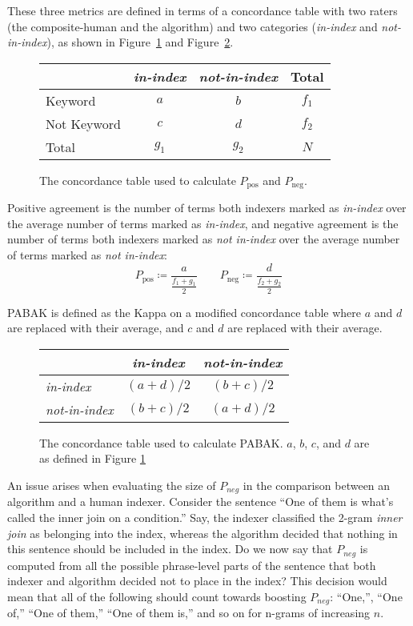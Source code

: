 These three metrics are defined in terms of a concordance table with
two raters (the composite-human and the algorithm) and two
categories ({\em in-index} and {\em not-in-index}), as shown in
Figure~\ref{fig:concordance_1} and Figure~\ref{fig:pabak}.

\begin{figure}[h]
\caption{The concordance table used to calculate $P_{\text{pos}}$ and $P_{\text{neg}}$. }
\label{fig:concordance_1}
\begin{tabular}{l || c c c}
& {\em in-index} & {\em not-in-index} & Total \\
\hline \hline
Keyword & $a$ & $b$ & $f_1$ \\
Not Keyword & $c$ & $d$ & $f_2$ \\
Total & $g_1$ & $g_2$ & $N$ \\
\end{tabular}
\end{figure}

Positive agreement is the number of terms both indexers marked as {\em
  in-index} over the average number of terms marked as {\em in-index}, and
negative agreement is the number of terms both indexers marked as {\em not
  in-index} over the average number of terms marked as {\em not
  in-index}:
\begin{equation*}
P_{\text{pos}} \coloneqq \frac{a}{\frac{f_1 + g_1}{2}}
 \qquad P_{\text{neg}} \coloneqq \frac{d}{\frac{f_2 + g_2}{2}}
\end{equation*}

PABAK is defined as the Kappa on a modified concordance table where $a$ and $d$ are replaced with their average, and $c$ and $d$ are replaced with their average.

\begin{figure}[h]
\caption{The concordance table used to calculate PABAK. $a$, $b$, $c$, and $d$ are as defined in Figure \ref{fig:concordance_1}}
\label{fig:pabak}
\begin{tabular}{l || c c }
& {\em in-index} & {\em not-in-index} \\
\hline \hline
{\em in-index} & $(a + d) / 2$ & $(b + c) / 2$ \\
{\em not-in-index} & $(b + c) / 2$ & $(a + d) / 2$ \\
\end{tabular}
\end{figure}

An issue arises when evaluating the size of $P_{neg}$ in the
comparison between an algorithm and a human indexer. Consider the
sentence ``One of them is what's called the inner join on a
condition.'' Say, the indexer classified the 2-gram {\em inner join}
as belonging into the index, whereas the algorithm decided that
nothing in this sentence should be included in the index. Do we now
say that $P_{neg}$ is computed from all the possible phrase-level
parts of the sentence that both indexer and algorithm decided not to
place in the index? This decision would mean that all of the following
should count towards boosting $P_{neg}$: ``One,'', ``One of,'' ``One
of them,'' ``One of them is,'' and so on for n-grams of increasing
$n$.

